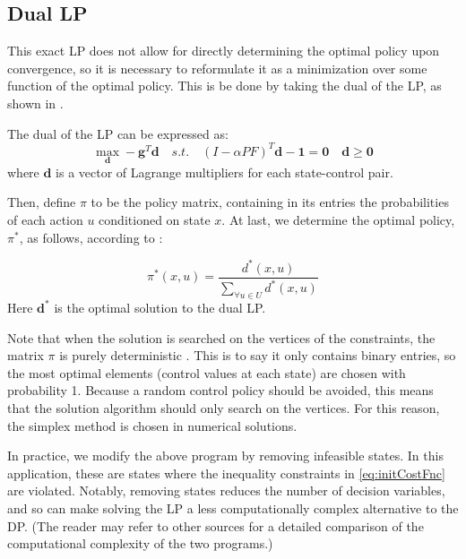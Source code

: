 \documentclass[conference]{IEEEtran}
\begin{document}
\subsection{Dual LP}
This exact LP does not allow for directly determining the optimal policy upon convergence, so it is necessary to reformulate it as a minimization over some function of the optimal policy. This is be done by taking the dual of the LP, as shown in \cite{4220813}.

The dual of the LP can be expressed as:
\begin{equation}
    \max_{\boldsymbol{d}} -\boldsymbol{g}^{T} \boldsymbol{d}
    \hspace{1em}s.t.\hspace{1em}(I-\alpha PF)^{T}\boldsymbol{d} - \boldsymbol{1} = \boldsymbol{0}\hspace{1em}\boldsymbol{d} \geq \boldsymbol{0}
\end{equation}
where $\boldsymbol{d}$ is a vector of Lagrange multipliers for each state-control pair.

Then, define $\pi$ to be the policy matrix, containing in its entries the probabilities of each action $u$ conditioned on state $x$. At last, we determine the optimal policy, $\pi^{*}$, as follows, according to \cite{4220813}:

\begin{equation}
\pi^{*}(x,u)=\frac{d^{*}(x,u)}{\sum_{\forall u \in U}d^{*}(x,u)}
\end{equation} Here $\boldsymbol{d^{*}}$ is the optimal solution to the dual LP.

Note that when the solution is searched on the vertices of the constraints, the matrix $\pi$ is purely deterministic \cite{MDPs}. This is to say it only contains binary entries, so the most optimal elements (control values at each state) are chosen with probability 1. Because a random control policy should be avoided, this means that the solution algorithm should only search on the vertices. For this reason, the simplex method is chosen in numerical solutions.

In practice, we modify the above program by removing infeasible states. In this application, these are states where the inequality constraints in \eqref{eq:initCostFnc} are violated. Notably, removing states reduces the number of decision variables, and so can make solving the LP a less computationally complex alternative to the DP. (The reader may refer to other sources for a detailed comparison of the computational complexity of the two programs.)
\end{document}
